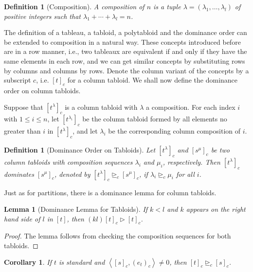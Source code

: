 \documentclass{assignment}[2019/10/15]
\newcommand{\lr}[3]{\left#1#3\right#2}
\theoremstyle{plain}
\newtheorem{definition}[theorem]{Definition}
\newtheorem{lemma}[theorem]{Lemma}
\newtheorem{corollary}[theorem]{Corollary}
\begin{document}
    \begin{definition}[Composition]
        A \emph{composition} of $n$ is a tuple $\lambda=(\lambda_1, \dotsc, \lambda_l)$ of positive integers such that $\lambda_1 + \dotsb + \lambda_l=n$.
    \end{definition}

    The definition of a tableau, a tabloid, a polytabloid and the dominance order can be extended to composition in a natural way. These concepts introduced before are in a row manner, i.e., two tableaux are equivalent if and only if they have the same elements in each row, and we can get similar concepts by substituting rows by columns and columns by rows. Denote the column variant of the concepts by a subscript $c$, i.e. $[t]_c$ for a column tabloid. We shall now define the dominance order on column tabloids.

    Suppose that $[t^\lambda]_c$ is a column tabloid with $\lambda$ a composition. For each index $i$ with $1\leq i\leq n$, let $[t^{\lambda_i}]_c$ be the column tabloid formed by all elements no greater than $i$ in $[t^\lambda]_c$, and let $\lambda_i$ be the corresponding column composition of $i$.

    \begin{definition}[Dominance Order on Tabloids]
        Let $[t^\lambda]_c$ and $[s^\mu]_c$ be two column tabloids with composition sequences $\lambda_i$ and $\mu_i$, respectively. Then $[t^\lambda]_c$ dominates $[s^\mu]_c$, denoted by $[t^\lambda]_c\unrhd_c [s^\mu]_c$, if $\lambda_i\unrhd_c\mu_i$ for all $i$.
    \end{definition}

    Just as for partitions, there is a dominance lemma for column tabloids.

    \begin{lemma}[Dominance Lemma for Tabloids]\label{lem: dom-tab}
        If $k<l$ and $k$ appears on the right hand side of $l$ in $[t]$, then $(k l)[t]_c\rhd[t]_c$.
    \end{lemma}

    \begin{proof}
        The lemma follows from checking the composition sequences for both tabloids.
    \end{proof}

    \begin{corollary}
        If $t$ is standard and $\lr<>{[s]_c, (e_t)_c}\neq 0$, then $[t]_c\unrhd_c [s]_c$.
    \end{corollary}
\end{document}
